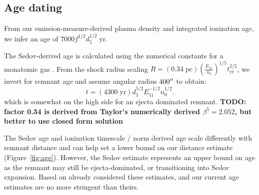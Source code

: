\documentclass[twocolumn,tighten,trackchanges]{aastex61}
\newcommand*{\mt}{\mathrm}
\newcommand*{\unit}[1]{\;\mt{#1}}  %
\begin{document}
\subsection{Age dating}

From our emission-measure-derived plasma density and integrated ionization age,
we infer an age of $7000 f^{1/2} d_{5}^{1/2} \unit{yr}$.

The Sedov-derived age \citep{taylor1950, sedov1959} is calculated using the
numerical constants for a monatomic gas \citet{taylor1950-pt2}.
From the shock radius scaling
$R = (0.34 \unit{pc}) \left( \frac{E_{51}}{n_0} \right)^{1/5} t_{\mt{yr}}^{2/5}$,
we invert for remnant age and assume angular radius $400\mbox{$^{\prime\prime}$}$ to obtain:
\[
    t = (4300 \unit{yr}) d_5^{5/2} E_{51}^{-1/2} n_0^{1/2} .
\]
which is somewhat on the high side for an ejecta dominated remnant.
\textbf{TODO: factor 0.34 is derived from Taylor's numerically derived
$\beta^5 = 2.052$, but better to use closed form solution}

The Sedov age and ionization timescale / norm derived age scale differently
with remnant distance and can help set a lower bound on our distance estimate
(Figure~\ref{fig:age}).
However, the Sedov estimate represents an upper bound on age as the remnant
may still be ejecta-dominated, or transitioning into Sedov expansion.
Based on
\citet{rakowski2001} already considered these estimates, and our current age
estimates are no more stringent than theirs.
\end{document}
